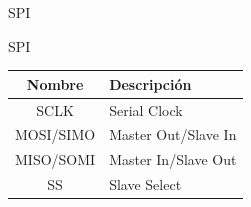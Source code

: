 \documentclass[xcolor=dvipsnames, handout]{beamer}
\begin{document}
\begin{frame}{SPI}
 \begin{block}{SPI}
  \begin{center}
\begin{tabular}{|c|p{}|}\hline
    Nombre	&	Descripción \\ \hline\hline
    SCLK	&	Serial Clock \\ \hline
    MOSI/SIMO	&	Master Out/Slave In\\ \hline
    MISO/SOMI	&	Master In/Slave Out\\ \hline
    SS		&	Slave Select\\ \hline
  \end{tabular}               \end{center}

 \end{block}

\end{frame}
\end{document}
